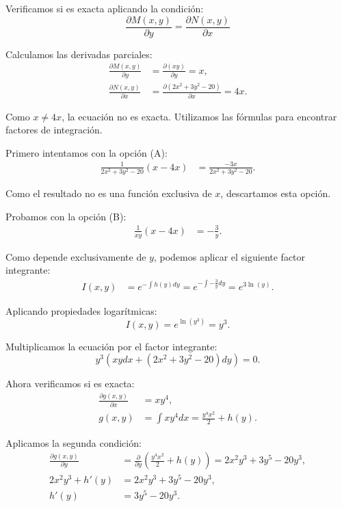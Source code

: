 \noindent Verificamos si es exacta aplicando la condición:
\[
\frac{\partial M( x,y)}{\partial y} = \frac{\partial N( x,y)}{\partial x}
\]

\noindent Calculamos las derivadas parciales:
\begin{align*}
\frac{\partial M( x,y)}{\partial y} &= \frac{\partial ( xy)}{\partial y} = x, \\
\frac{\partial N( x,y)}{\partial x} &= \frac{\partial ( 2x^{2} +3y^{2} -20)}{\partial x} = 4x.
\end{align*}

\noindent Como \( x \neq 4x \), la ecuación no es exacta. Utilizamos las fórmulas para encontrar factores de integración.

\noindent Primero intentamos con la opción (A):
\begin{align*}
\frac{1}{2x^{2} +3y^{2} -20} ( x-4x) &= \frac{-3x}{2x^{2} +3y^{2} -20}.
\end{align*}

\noindent Como el resultado no es una función exclusiva de \( x \), descartamos esta opción.

\noindent Probamos con la opción (B):
\begin{align*}
\frac{1}{xy} ( x-4x) &= -\frac{3}{y}.
\end{align*}

\noindent Como depende exclusivamente de \( y \), podemos aplicar el siguiente factor integrante:
\begin{align*}
I( x,y) &= e^{-\int h( y) dy} = e^{-\int -\frac{3}{y} dy} = e^{3\ln( y)}.
\end{align*}

\noindent Aplicando propiedades logarítmicas:
\[
I( x,y) = e^{\ln( y^{3})} = y^{3}.
\]

\noindent Multiplicamos la ecuación por el factor integrante:
\[
y^{3} ( xydx + ( 2x^{2} +3y^{2} -20) dy) = 0.
\]

\noindent Ahora verificamos si es exacta:
\begin{align*}
\frac{\partial g( x,y)}{\partial x} &= xy^{4}, \\
g( x,y) &= \int xy^{4} dx = \frac{y^{4} x^{2}}{2} + h( y).
\end{align*}

\noindent Aplicamos la segunda condición:
\begin{align*}
\frac{\partial g( x,y)}{\partial y} &= \frac{\partial}{\partial y} \left( \frac{y^{4} x^{2}}{2} + h( y)\right) = 2x^{2} y^{3} +3y^{5} -20y^{3}, \\
2x^{2} y^{3} + h'( y) &= 2x^{2} y^{3} +3y^{5} -20y^{3}, \\
h'( y) &= 3y^{5} -20y^{3}.
\end{align*}


